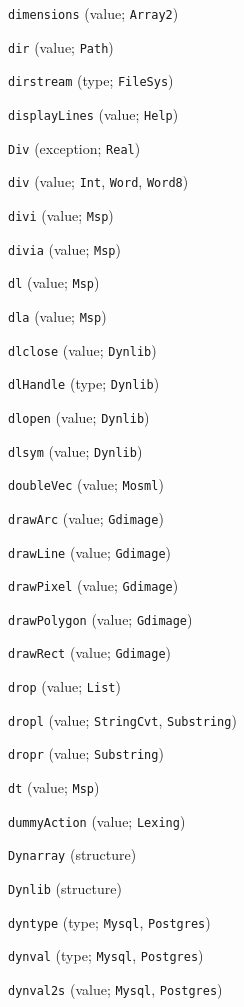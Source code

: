 \begin{description}
\item[] \verb"dimensions" (value; \verb"Array2")
\item[] \verb"dir" (value; \verb"Path")
\item[] \verb"dirstream" (type; \verb"FileSys")
\item[] \verb"displayLines" (value; \verb"Help")
\item[] \verb"Div" (exception; \verb"Real")
\item[] \verb"div" (value; \verb"Int", \verb"Word", \verb"Word8")
\item[] \verb"divi" (value; \verb"Msp")
\item[] \verb"divia" (value; \verb"Msp")
\item[] \verb"dl" (value; \verb"Msp")
\item[] \verb"dla" (value; \verb"Msp")
\item[] \verb"dlclose" (value; \verb"Dynlib")
\item[] \verb"dlHandle" (type; \verb"Dynlib")
\item[] \verb"dlopen" (value; \verb"Dynlib")
\item[] \verb"dlsym" (value; \verb"Dynlib")
\item[] \verb"doubleVec" (value; \verb"Mosml")
\item[] \verb"drawArc" (value; \verb"Gdimage")
\item[] \verb"drawLine" (value; \verb"Gdimage")
\item[] \verb"drawPixel" (value; \verb"Gdimage")
\item[] \verb"drawPolygon" (value; \verb"Gdimage")
\item[] \verb"drawRect" (value; \verb"Gdimage")
\item[] \verb"drop" (value; \verb"List")
\item[] \verb"dropl" (value; \verb"StringCvt", \verb"Substring")
\item[] \verb"dropr" (value; \verb"Substring")
\item[] \verb"dt" (value; \verb"Msp")
\item[] \verb"dummyAction" (value; \verb"Lexing")
\item[] \verb"Dynarray" (structure)
\item[] \verb"Dynlib" (structure)
\item[] \verb"dyntype" (type; \verb"Mysql", \verb"Postgres")
\item[] \verb"dynval" (type; \verb"Mysql", \verb"Postgres")
\item[] \verb"dynval2s" (value; \verb"Mysql", \verb"Postgres")
\\[2ex]


\end{description}
